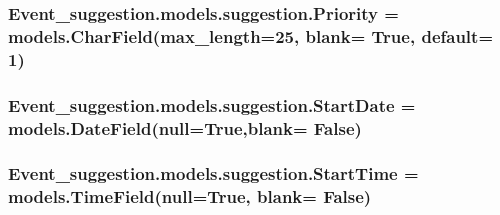 \subsubsection[{\texorpdfstring{Priority}{Priority}}]{\setlength{\rightskip}{0pt plus 5cm}Event\+\_\+suggestion.\+models.\+suggestion.\+Priority = models.\+Char\+Field(max\+\_\+length=25, blank= True, default= \textquotesingle{}1\textquotesingle{})\hspace{0.3cm}{\ttfamily [static]}}\hypertarget{classEvent__suggestion_1_1models_1_1suggestion_a3bcf2e84c25ad2c81f42731e6d45db56}{}\label{classEvent__suggestion_1_1models_1_1suggestion_a3bcf2e84c25ad2c81f42731e6d45db56}
\subsubsection[{\texorpdfstring{Start\+Date}{StartDate}}]{\setlength{\rightskip}{0pt plus 5cm}Event\+\_\+suggestion.\+models.\+suggestion.\+Start\+Date = models.\+Date\+Field(null=True,blank= False)\hspace{0.3cm}{\ttfamily [static]}}\hypertarget{classEvent__suggestion_1_1models_1_1suggestion_a37a303d9f70fe68d539e874d98264d8e}{}\label{classEvent__suggestion_1_1models_1_1suggestion_a37a303d9f70fe68d539e874d98264d8e}
\subsubsection[{\texorpdfstring{Start\+Time}{StartTime}}]{\setlength{\rightskip}{0pt plus 5cm}Event\+\_\+suggestion.\+models.\+suggestion.\+Start\+Time = models.\+Time\+Field(null=True, blank= False)\hspace{0.3cm}{\ttfamily [static]}}\hypertarget{classEvent__suggestion_1_1models_1_1suggestion_a076480c48f595075b949897a12db263e}{}\label{classEvent__suggestion_1_1models_1_1suggestion_a076480c48f595075b949897a12db263e}
